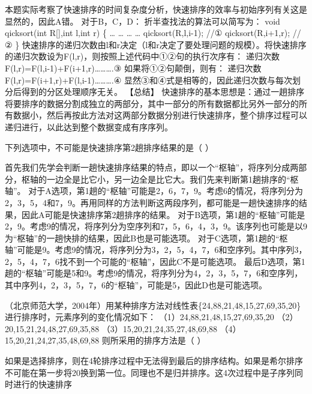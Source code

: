 \begin{solution}本题实际考察了快速排序的时间复杂度分析，快速排序的效率与初始序列有关这是显然的，因此A错。
对于B，C，D： 折半查找法的算法可以简写为： void qicksort(int R{[}{]},int
l,int r) \{ \ldots{} \ldots{} \ldots{} \ldots{} qicksort(R,l,i-1); //①
qicksort(R,i+1,r); //② \}
快速排序的递归次数由l和r决定（l和r决定了要处理问题的规模）。将快速排序的递归次数设为F(l,r)，则按照上述代码中①②句的执行次序有：
递归次数F(l,r)=F(l,i-1)+F(i+1,r)\ldots{}\ldots{}\ldots{}.③
如果将①②句颠倒，则有：
递归次数F(l,r)=F(i+1,r)+F(l,i-1)\ldots{}\ldots{}\ldots{}.④
显然③和④式是相等的，因此递归次数与每次划分后得到的分区处理顺序无关。
【总结】
快速排序的基本思想是：通过一趟排序将要排序的数据分割成独立的两部分，其中一部分的所有数据都比另外一部分的所有数据小，然后再按此方法对这两部分数据分别进行快速排序，整个排序过程可以递归进行，以此达到整个数据变成有序序列。
\end{solution}
\question 下列选项中，不可能是快速排序第2趟排序结果的是（ ）
\par{}
\begin{solution}首先我们先学会判断一趟快速排序结果的特点，即以一个``枢轴''，将序列分成两部分，枢轴的一边全是比它小，另一边全是比它大。我们先来判断第1趟排序的``枢轴''。
对于A选项，第1趟的``枢轴''可能是2，6，7，9。考虑6的情况，将序列分为2，3，5，4和7，9。再用同样的方法判断这两段序列，都可能是一趟快速排序的结果，因此A可能是快速排序第2趟排序的结果。
对于B选项，第1趟的``枢轴''可能是2，9。考虑9的情况，将序列分为空序列和7，5，6，4，3，9。该序列也可能是以9为``枢轴''的一趟快排的结果，因此B也是可能选项。
对于C选项，第1趟的``枢轴''可能是9。考虑9的情况，将序列分为3，2，5，4，7，6和空序列。其中序列3，2，5，4，7，6找不到一个可能的``枢轴''，因此C不是可能选项。
最后D选项，第1趟的``枢轴''可能是5和9。考虑9的情况，将序列分为4，2，3，5，7，6和空序列，其中序列4，2，3，5，7，6的``枢轴''，可能是5，因此D也是可能选项。
\end{solution}
\question （北京师范大学，2004年）用某种排序方法对线性表\{24,88,21,48,15,27,69,35,20\}进行排序时，元素序列的变化情况如下：
（1）24,88,21,48,15,27,69,35,20 （2）20,15,21,24,48,27,69,35,88
（3）15,20,21,24,35,27,48,69,88 （4）15,20,21,24,27,35,48,69,88
则所采用的排序方法是（ ）
\par{}
\begin{solution}如果是选择排序，则在4轮排序过程中无法得到最后的排序结构。如果是希尔排序不可能在第一步将20换到第一位。同理也不是归并排序。这4次过程中是子序列同时进行的快速排序
\end{solution}
